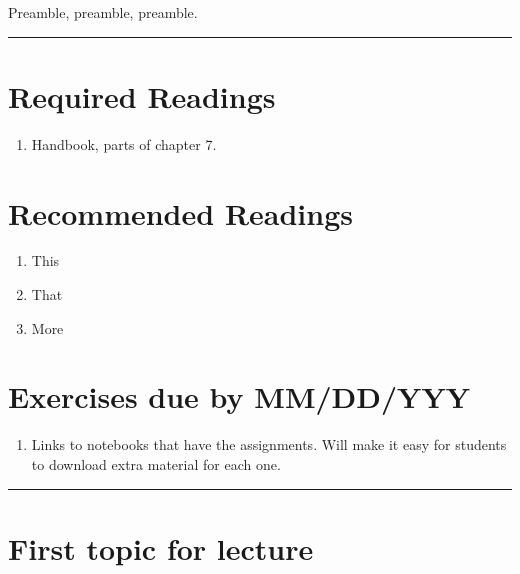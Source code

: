 \documentclass[]{book}
\providecommand{\tightlist}{%
  \setlength{\itemsep}{0pt}\setlength{\parskip}{0pt}}
\begin{document}
Preamble, preamble, preamble.

\begin{center}\rule{0.5\linewidth}{\linethickness}\end{center}

\hypertarget{required-readings-4}{%
\section*{Required Readings}\label{required-readings-4}}

\begin{enumerate}
\def\labelenumi{\arabic{enumi}.}
\tightlist
\item
  Handbook, parts of chapter 7.
\end{enumerate}

\hypertarget{recommended-readings-4}{%
\section*{Recommended Readings}\label{recommended-readings-4}}

\begin{enumerate}
\def\labelenumi{\arabic{enumi}.}
\tightlist
\item
  This
\item
  That
\item
  More
\end{enumerate}

\hypertarget{exercises-due-by-mmddyyy-4}{%
\section*{Exercises due by MM/DD/YYY}\label{exercises-due-by-mmddyyy-4}}

\begin{enumerate}
\def\labelenumi{\arabic{enumi}.}
\tightlist
\item
  Links to notebooks that have the assignments. Will make it
  easy for students to download extra material for each one.
\end{enumerate}

\begin{center}\rule{0.5\linewidth}{\linethickness}\end{center}

\hypertarget{first-topic-for-lecture-4}{%
\section{First topic for lecture}\label{first-topic-for-lecture-4}}
\end{document}
